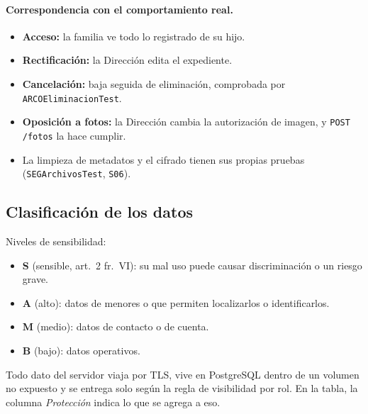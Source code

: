 \paragraph{Correspondencia con el comportamiento real.}
\begin{itemize}
	\item \textbf{Acceso:} la familia ve todo lo registrado de su hijo.
	\item \textbf{Rectificación:} la Dirección edita el expediente.
	\item \textbf{Cancelación:} baja seguida de eliminación, comprobada por \texttt{ARCOEliminacion\allowbreak{}Test}.
	\item \textbf{Oposición a fotos:} la Dirección cambia la autorización de imagen, y \texttt{POST /\allowbreak{}fotos} la hace cumplir.
	\item La limpieza de metadatos y el cifrado tienen sus propias pruebas (\texttt{SEGArchivos\allowbreak{}Test}, \texttt{S06}).
\end{itemize}

\subsection{Clasificación de los datos}
Niveles de sensibilidad:
\begin{itemize}
	\item \textbf{S} (sensible, art.~2 fr.~VI): su mal uso puede causar discriminación o un riesgo grave.
	\item \textbf{A} (alto): datos de menores o que permiten localizarlos o identificarlos.
	\item \textbf{M} (medio): datos de contacto o de cuenta.
	\item \textbf{B} (bajo): datos operativos.
\end{itemize}
Todo dato del servidor viaja por TLS, vive en PostgreSQL dentro de un volumen no expuesto y se entrega solo según la regla de visibilidad por rol. En la tabla, la columna \emph{Protección} indica lo que se agrega a eso.

